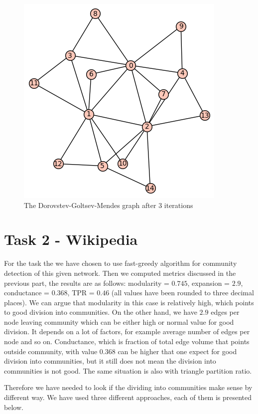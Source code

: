 \documentclass[paper=a4, fontsize=11pt]{scrartcl} %
\begin{document}
\begin{figure}[htbp]
   \centering
   \includegraphics{dgm} %
   \caption{The Dorovstev-Goltsev-Mendes graph after $3$ iterations}
   \label{dgm}
\end{figure}

\section{Task 2 - Wikipedia}

For the task the we have chosen to use fast-greedy algorithm for community detection of this given network. Then we computed metrics discussed in the previous part, the results are as follows: modularity = $0.745$, expansion = $2.9$, conductance = $0.368$, TPR = $0.46$ (all values have been rounded to three decimal places). We can argue that modularity in this case is relatively high, which points to good division into communities. On the other hand, we have $2.9$ edges per node leaving community which can be either high or normal value for good division. It depends on a lot of factors, for example average number of edges per node and so on. Conductance, which is fraction of total edge volume that points outside community, with value $0.368$ can be higher that one expect for good division into communities, but it still does not mean the division into communities is not good. The same situation is also with triangle partition ratio.

Therefore we have needed to look if the dividing into communities make sense by different way. We have used three different approaches, each of them is presented below.
\end{document}
